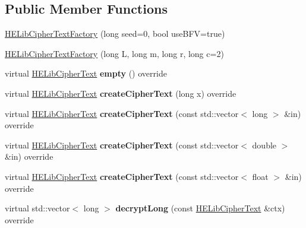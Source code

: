 \subsection*{Public Member Functions}
\begin{DoxyCompactItemize}
\item 
\hyperlink{classHELibCipherTextFactory_a097caa3314d257038989d27258cc9daf}{H\+E\+Lib\+Cipher\+Text\+Factory} (long seed=0, bool use\+B\+FV=true)
\item 
\hyperlink{classHELibCipherTextFactory_a725b27d7e0a60a6d2a9af33678f657be}{H\+E\+Lib\+Cipher\+Text\+Factory} (long L, long m, long r, long c=2)
\item 
\mbox{\label{classHELibCipherTextFactory_aa262d2d08568dec07604be04f514bffd}} 
virtual \hyperlink{classHELibCipherText}{H\+E\+Lib\+Cipher\+Text} {\bfseries empty} () override
\item 
\mbox{\label{classHELibCipherTextFactory_a438737fdf18c80a7552c15ad335217d4}} 
virtual \hyperlink{classHELibCipherText}{H\+E\+Lib\+Cipher\+Text} {\bfseries create\+Cipher\+Text} (long x) override
\item 
\mbox{\label{classHELibCipherTextFactory_a41b3d0604490f6135e0e729be22f28cb}} 
virtual \hyperlink{classHELibCipherText}{H\+E\+Lib\+Cipher\+Text} {\bfseries create\+Cipher\+Text} (const std\+::vector$<$ long $>$ \&in) override
\item 
\mbox{\label{classHELibCipherTextFactory_af6fe83a8629c090430952229ec25b32c}} 
virtual \hyperlink{classHELibCipherText}{H\+E\+Lib\+Cipher\+Text} {\bfseries create\+Cipher\+Text} (const std\+::vector$<$ double $>$ \&in) override
\item 
\mbox{\label{classHELibCipherTextFactory_afbd76ff874f2a66161ada236ca7652e4}} 
virtual \hyperlink{classHELibCipherText}{H\+E\+Lib\+Cipher\+Text} {\bfseries create\+Cipher\+Text} (const std\+::vector$<$ float $>$ \&in) override
\item 
\mbox{\label{classHELibCipherTextFactory_a9f5ff1d324a4c4eab822ac2bbce2f12b}} 
virtual std\+::vector$<$ long $>$ {\bfseries decrypt\+Long} (const \hyperlink{classHELibCipherText}{H\+E\+Lib\+Cipher\+Text} \&ctx) override

\end{DoxyCompactItemize}

